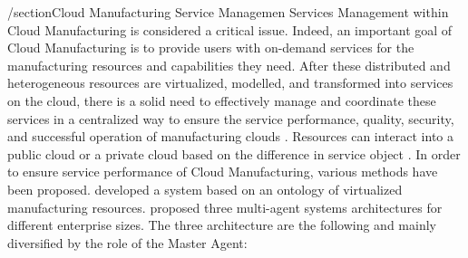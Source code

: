 /section{Cloud Manufacturing Service Managemen}
Services Management within Cloud Manufacturing is considered a critical issue. Indeed, an important goal of Cloud Manufacturing is to provide users with on-demand services for the manufacturing resources and capabilities they need. After these distributed and heterogeneous resources are virtualized, modelled, and transformed into services on the cloud, there is a solid need to effectively manage and coordinate these services in a centralized way to ensure the service performance, quality, security, and successful operation of manufacturing clouds \parencite{he_state---art_2015}. Resources can interact into a public cloud or a private cloud based on the difference in service object \parencite{zhang_cloud_2014}. In order to ensure service performance of Cloud Manufacturing, various methods have been proposed. \textcite{model_information_2012} developed a system based on an ontology of virtualized manufacturing resources. \textcite{liu_resource_2011} proposed three multi-agent systems architectures for different enterprise sizes. The three architecture are the following and mainly diversified by the role of the Master Agent:
